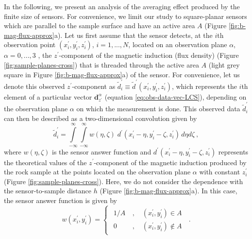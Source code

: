 \documentclass[draft,gc]{agutex}
\begin{document}
\begin{article}
In the following, we present an analysis of the averaging effect produced
by the finite size of sensors. 
For convenience, we limit our study to square-planar 
sensors which are parallel to the sample surface and have an
active area $A$ (Figure \ref{fig:b-mag-flux-approx}a).
Let us first assume that the sensor detects,
at the $i$th observation point $(x^{\prime}_{i}, y^{\prime}_{i}, z^{\prime}_{i})$, 
$i = 1, ..., N$, located on an observation plane $\alpha$,
$\alpha = 0, ..., 3$ , the $z^{\prime}$-component of 
the magnetic induction (flux density) 
(Figure \ref{fig:sample-planes-cross}) that is 
threaded through the active area $A$ 
(light grey square in Figure \ref{fig:b-mag-flux-approx}a)
of the sensor.
For convenience, let us denote this observed $z^{\prime}$-component
as $\tilde{d}^{\prime}_{i} \equiv \tilde{d}^{\prime}(x^{\prime}_{i}, y^{\prime}_{i}, z^{\prime}_{i})$,
which represents the $i$th element of a particular vector 
$\mathbf{d}^{\alpha}_{z^{\prime}}$ (equation \ref{eq:obs-data-vec-LCS}),
depending on the observation plane $\alpha$ on 
which the measurement is done.
This observed data $\tilde{d}^{\prime}_{i}$ can then be described as a 
two-dimensional convolution given by
\begin{equation}
\tilde{d}^{\prime}_{i} = 
\int \limits_{-\infty}^{\infty} \int \limits_{-\infty}^{\infty}
w(\eta, \zeta) \; d^{\prime}(x^{\prime}_{i} - \eta, 
                             y^{\prime}_{i} - \zeta,
                             z^{\prime}_{i}) \, d\eta d\zeta \: ,
\label{eq:b-mag-flux}
\end{equation}
where $w(\eta, \zeta)$ is the sensor answer function \citep{egli2000}
and $d^{\prime}(x^{\prime}_{i} - \eta, y^{\prime}_{i} - \zeta, z^{\prime}_{i})$
represents the theoretical values of the $z^{\prime}$-component of 
the magnetic induction produced by the rock sample at the points located on 
the observation plane $\alpha$ with constant 
$z^{\prime}_{i}$ (Figure \ref{fig:sample-planes-cross}).
Here, we do not consider the
dependence with the sensor-to-sample distance $h$ 
(Figure \ref{fig:b-mag-flux-approx}a).
In this case, the sensor answer function 
is given by \citep{egli2000}
\begin{equation}
w(x^{\prime}_{i}, y^{\prime}_{i}) = \begin{cases}
\begin{split}
1/A &\: , \quad (x^{\prime}_{i}, y^{\prime}_{i}) \in A \\
0 &\: , \quad (x^{\prime}_{i}, y^{\prime}_{i}) \notin A
\end{split}
\end{cases} \: .

\end{equation}
\end{article}
\end{document}
